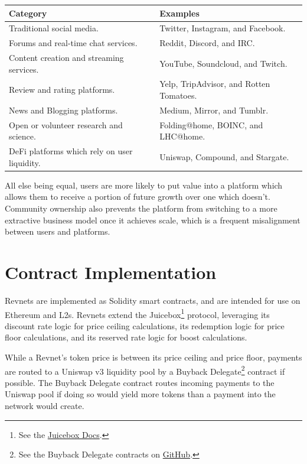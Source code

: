 \documentclass{article}
\begin{document}
\begin{table}[h]
  \centering
  \begin{tabular}{|l|l|}
    \hline \textbf{Category} & \textbf{Examples} \\
    \hline Traditional social media. & Twitter, Instagram, and Facebook. \\
    \hline Forums and real-time chat services. & Reddit, Discord, and IRC. \\
    \hline Content creation and streaming services. & YouTube, Soundcloud, and Twitch. \\
    \hline Review and rating platforms. & Yelp, TripAdvisor, and Rotten Tomatoes. \\
    \hline News and Blogging platforms. & Medium, Mirror, and Tumblr. \\
    \hline Open or volunteer research and science. & Folding@home, BOINC, and LHC@home. \\
    \hline DeFi platforms which rely on user liquidity. & Uniswap, Compound, and Stargate. \\
    \hline
  \end{tabular}
\end{table}

All else being equal, users are more likely to put value into a platform which allows them to receive a portion of future growth over one which doesn't. Community ownership also prevents the platform from switching to a more extractive business model once it achieves scale, which is a frequent misalignment between users and platforms.

\section{Contract Implementation}

Revnets are implemented as Solidity smart contracts, and are intended for use on Ethereum and L2s. Revnets extend the Juicebox\footnote{See the \href{https://docs.juicebox.money}{Juicebox Docs}.} protocol, leveraging its discount rate logic for price ceiling calculations, its redemption logic for price floor calculations, and its reserved rate logic for boost calculations.

While a Revnet's token price is between its price ceiling and price floor, payments are routed to a Uniswap v3 liquidity pool by a Buyback Delegate\footnote{See the Buyback Delegate contracts on \href{https://github.com/jbx-protocol/juice-buyback}{GitHub}.} contract if possible. The Buyback Delegate contract routes incoming payments to the Uniswap pool if doing so would yield more tokens than a payment into the network would create.
\end{document}
